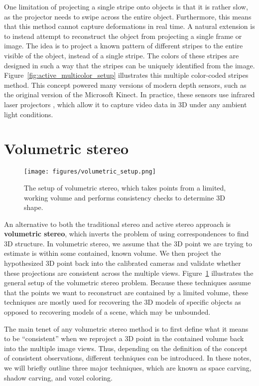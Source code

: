 \documentclass[a4paper, 12pt]{article}
\renewcommand\emph{\textbf}
\numberwithin{equation}{section}
\begin{document}
One limitation of projecting a single stripe onto objects is that it is rather slow, as the projector needs to swipe across the entire object. Furthermore, this means that this method cannot capture deformations in real time. A natural extension is to instead attempt to reconstruct the object from projecting a single frame or image. The idea is to project a known pattern of different stripes to the entire visible of the object, instead of a single stripe. The colors of these stripes are designed in such a way that the stripes can be uniquely identified from the image. Figure~\ref{fig:active_multicolor_setup} illustrates this multiple color-coded stripes method. This concept powered many versions of modern depth sensors, such as the original version of the Microsoft Kinect. In practice, these sensors use infrared laser projectors , which  allow it to capture video data in 3D under any ambient light conditions. 

\section{Volumetric stereo}
\begin{figure}[h!]
    \centering
    \texttt{[image: figures/volumetric\_setup.png]}
    \caption{The setup of volumetric stereo, which takes points from a limited, working volume and performs consistency checks to determine 3D shape.}
    \label{fig:volumetric_setup}
\end{figure}
An alternative to both the traditional stereo and active stereo approach is \emph{volumetric stereo}, which inverts the problem of using correspondences to find 3D structure. In volumetric stereo, we assume that the 3D point we are trying to estimate is within some contained, known volume. We then project the hypothesized 3D point back into the calibrated cameras and validate whether these projections are consistent across the multiple views. Figure~\ref{fig:volumetric_setup} illustrates the general setup of the volumetric stereo problem. Because these techniques assume that the points we want to reconstruct are contained by a limited volume, these techniques are mostly used for recovering the 3D models of specific objects as opposed to recovering models of a scene, which may be unbounded. 

The main tenet of any volumetric stereo method is to first define what it means to be ``consistent'' when we reproject a 3D point in the contained volume back into the multiple image views. Thus, depending on the definition of the concept of consistent observations, different techniques can be introduced. In these notes, we will briefly outline three major techniques, which are known as space carving, shadow carving, and voxel coloring.
\end{document}
